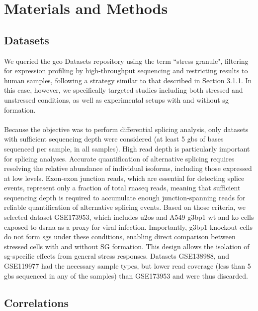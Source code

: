 \section{Materials and Methods}

\subsection{Datasets}

We queried the \gls{geo} Datasets repository using the term ``stress granule", filtering for expression profiling by high-throughput sequencing and restricting results to human samples, following a strategy similar to that described in Section 3.1.1. In this case, however, we specifically targeted studies including both stressed and unstressed conditions, as well as experimental setups with and without \gls{sg} formation.
\\
\\
Because the objective was to perform differential splicing analysis, only datasets with sufficient sequencing depth were considered (at least 5 \glspl{gb} of bases sequenced per sample, in all samples). High read depth is particularly important for splicing analyses. Accurate quantification of alternative splicing requires resolving the relative abundance of individual isoforms, including those expressed at low levels\cite{ascensao-ferreira_betas_2024}. Exon-exon junction reads, which are essential for detecting splice events, represent only a fraction of total \gls{rnaseq} reads, meaning that sufficient sequencing depth is required to accumulate enough junction-spanning reads for reliable quantification of alternative splicing events\cite{ascensao-ferreira_betas_2024}. Based on those criteria, we selected dataset GSE173953\cite{paget_stress_2023}, which includes \gls{u2os} and A549 \gls{g3bp1} \gls{wt} and \gls{ko} cells exposed to \gls{dsrna} as a proxy for viral infection. Importantly, \gls{g3bp1} knockout cells do not form \glspl{sg} under these conditions, enabling direct comparison between stressed cells with and without SG formation. This design allows the isolation of \gls{sg}-specific effects from general stress responses. Datasets GSE138988\cite{matheny_transcriptome-wide_2019}, and GSE119977\cite{matheny_rna_2021, matheny_corrigendum_2023} had the necessary sample types, but lower read coverage (less than 5 \glspl{gb} sequenced in any of the samples) than GSE173953\cite{paget_stress_2023} and were thus discarded.

\subsection{Correlations}

